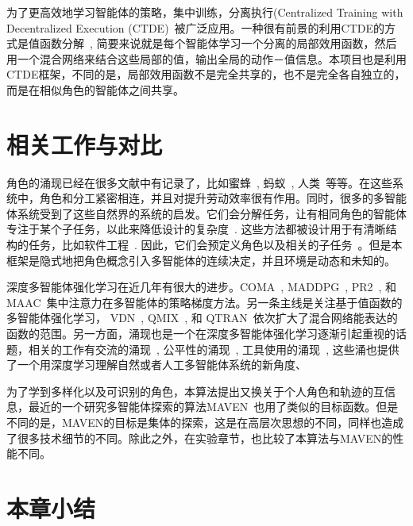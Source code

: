 为了更高效地学习智能体的策略，集中训练，分离执行(Centralized Training with Decentralized Execution (CTDE)~\cite{foerster2016learning, foerster2018counterfactual}被广泛应用。一种很有前景的利用CTDE的方式是值函数分解~\cite{sunehag2018value, rashid2018qmix, son2019qtran}, 简要来说就是每个智能体学习一个分离的局部效用函数，然后用一个混合网络来结合这些局部的值，输出全局的动作－值信息。本项目也是利用CTDE框架，不同的是，局部效用函数不是完全共享的，也不是完全各自独立的，而是在相似角色的智能体之间共享。

\section{相关工作与对比}
角色的涌现已经在很多文献中有记录了，比如蜜蜂~\cite{jeanson2005emergence}, 蚂蚁~\cite{gordon1996organization}, 人类~\cite{butler2012condensed}等等。在这些系统中，角色和分工紧密相连，并且对提升劳动效率很有作用。同时，很多的多智能体系统受到了这些自然界的系统的启发。它们会分解任务，让有相同角色的智能体专注于某个子任务，以此来降低设计的复杂度~\cite{wooldridge2000gaia, omicini2000soda, padgham2002prometheus, pavon2003agent, cossentino2005passi, zhu2008role, spanoudakis2010using, deloach2010mase, bonjean2014adelfe}. 这些方法都被设计用于有清晰结构的任务，比如软件工程~\cite{bresciani2004tropos}. 因此，它们会预定义角色以及相关的子任务~\cite{ Lhaksmana2018role}。但是本框架是隐式地把角色概念引入多智能体的连续决定，并且环境是动态和未知的。

深度多智能体强化学习在近几年有很大的进步。COMA~\citep{foerster2018counterfactual}, MADDPG~\citep{lowe2017multi}, PR2~\citep{wen2019probabilistic}, 和MAAC~\cite{iqbal2019actor}集中注意力在多智能体的策略梯度方法。另一条主线是关注基于值函数的多智能体强化学习， VDN~\citep{sunehag2018value}, QMIX~\citep{rashid2018qmix}, 和 QTRAN~\citep{son2019qtran}依次扩大了混合网络能表达的函数的范围。另一方面，涌现也是一个在深度多智能体强化学习逐渐引起重视的话题，相关的工作有交流的涌现~\cite{foerster2016learning, lazaridou2017multi, das2017learning, mordatch2018emergence}, 公平性的涌现~\cite{jiang2019learning}, 工具使用的涌现~\cite{baker2020emergent}, 这些涌也提供了一个用深度学习理解自然或者人工多智能体系统的新角度、

为了学到多样化以及可识别的角色，本算法提出又换关于个人角色和轨迹的互信息，最近的一个研究多智能体探索的算法MAVEN~\cite{mahajan2019maven}也用了类似的目标函数。但是不同的是，MAVEN的目标是集体的探索，这是在高层次思想的不同，同样也造成了很多技术细节的不同。除此之外，在实验章节，也比较了本算法与MAVEN的性能不同。

\section{本章小结}

